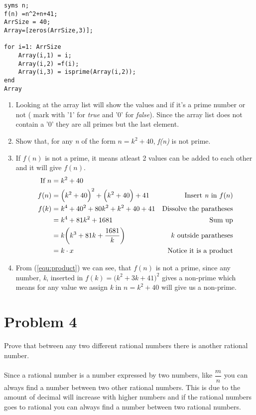 \documentclass[english,10pt,a4paper]{article}
\begin{document}
\begin{lstlisting}[caption=title, style=Code-Matlab, label=lst:ref]
syms n;
f(n) =n^2+n+41;
ArrSize = 40;
Array=[zeros(ArrSize,3)];

for i=1: ArrSize
    Array(i,1) = i;
    Array(i,2) =f(i);
    Array(i,3) = isprime(Array(i,2));
end
Array
\end{lstlisting}
\begin{enumerate}[b]
\item[] Looking at the array list will show the values and if it's a prime number or not ( mark with '1' for \textit{true} and '0' for \textit{false}).
Since the array list does not contain a '0' they are all primes but the last element.

\item Show that, for any \textit{n} of the form $n = k^2 + 40$, \textit{f(n)} is not prime.
\item[] If $f(n)$ is not a prime, it means atleast 2 values can be added to each other and it will give $f(n)$.
\begin{align}
\text{If } n &= k^2 + 40 \\
f(n) &=\Big(k^2+40\Big)^2+\Big(k^2+40\Big)+41  & \text{Insert \textit{n} in } f(n)\\
f(k) &= k^4 + 40^2 +80k^2+ k^2+40+41 & \text{Dissolve the paratheses}\\
	&= k^4+81k^2+1681 & \text{Sum up}\\
	&= k\bigg(k^3 + 81k+\dfrac{1681}{k}\bigg) &k \text{ outside paratheses}\\
	&= k \cdot x & \text{Notice it is a product} \label{equ:product}
\end{align}
\item[] From (\ref{equ:product}) we can see, that $f(n)$ is not a prime, since any number, \textit{k}, inserted in $f(k) =\Big(k^2+3k+41 \Big)^2$ gives a non-prime which means for any value we assign \textit{k} in $n=k^2+40$ will give us a non-prime.
\end{enumerate}



\section*{Problem 4}
Prove that between any two different rational numbers there is another rational number.
\\
\\
Since a rational number is a number expressed by two numbers, like $\dfrac{m}{n}$ you can always find a number between two other rational numbers.
This is due to the amount of decimal will increase with higher numbers and if the rational numbers goes to rational you can always find a number between two rational numbers.
\end{document}
